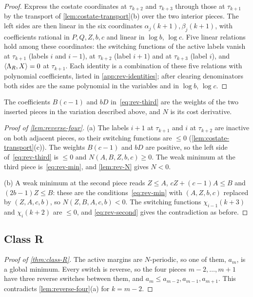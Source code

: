\begin{proof}
Express the costate coordinates at $\tau_{k+2}$ and $\tau_{k+3}$ through those at $\tau_{k+1}$ by
the transport of \cref{lem:costate-transport}(b) over the two interior pieces. The left sides
are then linear in the six coordinates $\alpha_j(k+1),\beta_j(k+1)$, with coefficients rational
in $P,Q,Z,b,c$ and linear in $\log b$, $\log c$. Five linear relations hold among these
coordinates: the switching functions of the active labels vanish at
$\tau_{k+1}$ (labels $i$ and $i-1$), at $\tau_{k+2}$ (label $i+1$) and at $\tau_{k+3}$ (label $i$),
and $\langle \Lambda_R,X\rangle=0$ at $\tau_{k+1}$. Each identity is a combination of these five relations
with polynomial coefficients, listed in \cref{app:rev-identities}; after clearing denominators
both sides are the same polynomial in the variables and in $\log b$, $\log c$.
\end{proof}

The coefficients $B(c-1)$ and $bD$ in~\eqref{eq:rev-third} are the weights of the two
inserted pieces in the variation described above, and $N$ is its cost derivative.

\begin{proof}[Proof of \cref{lem:reverse-four}]
(a) The labels $i+1$ at $\tau_{k+1}$ and $i$ at $\tau_{k+2}$ are inactive on both adjacent pieces,
so their switching functions are $\le0$ (\cref{lem:costate-transport}(c)). The weights
$B(c-1)$ and $bD$ are positive, so the left side of~\eqref{eq:rev-third} is $\le0$
and $N(A,B,Z,b,c)\ge0$. The weak minimum at the third piece is~\eqref{eq:rev-min}, and
\cref{lem:rev-N} gives $N<0$.

(b) A weak minimum at the second piece reads $Z\le A$, $cZ+(c-1)A\le B$ and $(2b-1)Z\le B$: these
are the conditions~\eqref{eq:rev-min} with $(A,Z,b,c)$ replaced by $(Z,A,c,b)$, so
$N(Z,B,A,c,b)<0$. The switching functions $\chi_{i-1}(k+3)$ and $\chi_i(k+2)$ are $\le0$, and
\eqref{eq:rev-second} gives the contradiction as before.
\end{proof}

\subsection{Class R}\label{sec:rev-R}

\begin{proof}[Proof of \cref{thm:class-R}]
The active margins are $N$-periodic, so one of them, $a_m$, is a global minimum. Every switch is
reverse, so the four pieces $m-2,\dots,m+1$ have three reverse switches between them, and
$a_m\le a_{m-2},a_{m-1},a_{m+1}$. This contradicts \cref{lem:reverse-four}(a) for $k=m-2$.
\end{proof}

